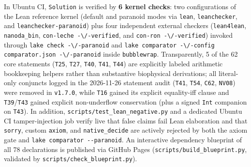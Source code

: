 \documentclass[11pt,reqno]{amsart}
\theoremstyle{plain}
\theoremstyle{definition}
\theoremstyle{remark}
\newcommand{\code}[1]{{\footnotesize\nolinkurl{#1}}}
\begin{document}
In Ubuntu CI, \code{Solution} is verified by \textbf{6 kernel checks}: two configurations of the Lean reference kernel (default and paranoid modes via \code{lean}, \code{leanchecker}, and \code{leanchecker-paranoid}) plus four independent external checkers (\code{lean4lean}, \code{nanoda\_bin}, \code{con-leche -\/-verified}, and \code{con-ron -\/-verified}) invoked through \code{lake check -\/-paranoid} and \code{lake comparator -\/-config comparator.json -\/-paranoid} inside \code{bubblewrap}. Transparently, 5 of the 62 core statements (\code{T25}, \code{T27}, \code{T40}, \code{T41}, \code{T44}) are explicitly labeled arithmetic bookkeeping helpers rather than substantive biophysical derivations; all literal-only conjuncts logged in the 2026-11-26 statement audit (\code{T41}, \code{T54}, \code{C62}, \code{NV08}) were removed in \texttt{v1.7.0}, while \code{T16} gained its explicit equality-iff clause and \code{T39}/\code{T43} gained explicit non-underflow conservation (plus a signed \code{Int} companion on \code{T43}). In addition, \code{scripts/test_lean_negative.py} and a dedicated Ubuntu CI tamper-injection job verify live that false claims fail Lean elaboration and that \texttt{sorry}, custom \texttt{axiom}, and \texttt{native\_decide} are actively rejected by both the axiom gate and \texttt{lake comparator -\/-paranoid}. An interactive dependency blueprint of all 78 declarations is published via GitHub Pages (\code{scripts/build_blueprint.py}, validated by \code{scripts/check_blueprint.py}).
\end{document}
